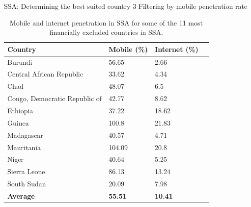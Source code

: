\documentclass[10pt]{beamer}
\begin{document}
\begin{frame}{SSA: Determining the best suited country 3}
    \vspace{.4cm}
    Filtering by mobile penetration rate

\begin{table}[ht]
\centering
\begin{tabular}{|l|l|l|l|}
\hline
\textbf{Country}        & \textbf{Mobile (\%)} & \textbf{Internet (\%)} \\ \hline
Burundi             & 56.65             & 2.66                                        \\ \hline
Central African Republic    & 33.62             & 4.34                                      \\ \hline
Chad              & 48.07             & 6.5                                       \\ \hline
Congo, Democratic Republic of & 42.77             & 8.62                                       \\ \hline
Ethiopia            & 37.22             & 18.62                                       \\ \hline
Guinea            & 100.8             & 21.83                                       \\ \hline
Madagascar          & 40.57             & 4.71                                        \\ \hline
Mauritania          & 104.09            & 20.8                                       \\ \hline
Niger             & 40.64             & 5.25                                        \\ \hline
Sierra Leone          & 86.13             & 13.24                                       \\ \hline
South Sudan           & 20.09             & 7.98                                        \\ \hline
\textbf{Average}        & \textbf{55.51}        & \textbf{10.41}                                        \\ \hline
\end{tabular}
\vspace{0.1cm}\caption{Mobile and internet penetration in SSA for some of the 11 most financially excluded countries in SSA.}
\end{table}
\end{frame}
\end{document}
